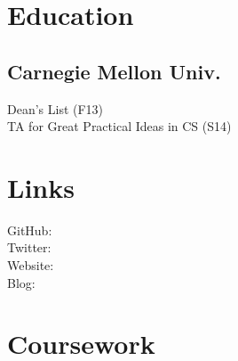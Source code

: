 \documentclass[]{deedy-resume-openfont}
\begin{document}
%
%
\lastupdated

%
%



%
%

\begin{minipage}[t]{0.33\textwidth} 


\section{Education} 

\subsection{Carnegie Mellon Univ.}
Dean's List (F13) \\
TA for Great Practical Ideas in CS (S14)
\sectionsep


\section{Links} 
GitHub: \href{https://github.com/Z1MM32M4N}{} \\
Twitter:  \href{https://twitter.com/Z1MM32M4N}{} \\
Website:  \href{http://www.zimmerman.io}{} \\
Blog:  \href{http://blog.zimmerman.io}{} \\
\sectionsep


\section{Coursework}

\end{minipage}
\end{document}
